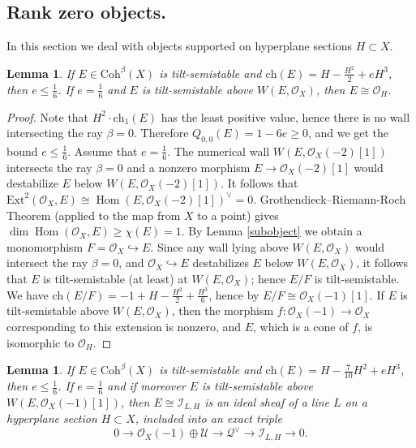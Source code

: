 \documentclass{amsart}
\DeclareMathOperator{\Hom}{Hom}
\newtheorem{lemma}[theorem]{Lemma}
\begin{document}
	\subsection{Rank zero objects.}\label{rank 0} In this section we deal with objects supported on hyperplane sections $H\subset X$.
	
	\begin{lemma}\label{0 1 -1/2} If $E\in\mathrm{Coh}^\beta(X)$ is tilt-semistable and $\mathrm{ch}(E)=H-\frac{H^2}{2}+eH^3$, then $e\le\frac 16$. If $e=\frac 16$ and $E$ is tilt-semistable above $W(E,\mathcal O_X)$, then $E\cong\mathcal O_H$.
	\end{lemma}
	
	\begin{proof}Note that $H^2\cdot\mathrm{ch}_1(E)$ has the least positive value, hence there is no wall intersecting the ray $\beta=0$. Therefore $Q_{0,0}(E)=1-6e\ge 0$, and we get the bound $e\le\frac 16$. Assume that $e=\frac 16$. The numerical wall $W(E,\mathcal O_X(-2)[1])$ intersects the ray $\beta=0$ and a nonzero morphism $E\to\mathcal O_X(-2)[1]$ would destabilize $E$ below $W(E,\mathcal O_X(-2)[1])$. It follows that $\mathrm{Ext}^2(\mathcal O_X,E)\cong\Hom(E,\mathcal O_X(-2)[1])^\vee=0$. Grothendieck--Riemann-Roch Theorem (applied to the map from $X$ to a point) gives $\dim \Hom(\mathcal O_X,E)\ge\chi(E)=1$. By Lemma \ref{subobject} we obtain a monomorphism $F=\mathcal O_X\hookrightarrow E$. Since any wall lying above $W(E,\mathcal O_X)$ would intersect the ray $\beta=0$, and $\mathcal O_X\hookrightarrow E$ destabilizes $E$ below $W(E,\mathcal O_X)$, it follows that $E$ is tilt-semistable (at least) at $W(E,\mathcal O_X)$; hence $E/F$ is tilt-semistable. We have $\mathrm{ch}(E/F)=-1+H-\frac{H^2}{2}+\frac{H^3}{6}$, hence by \cite[Corollary 3.3]{Vass} $E/F\cong\mathcal O_X(-1)[1]$. If $E$ is tilt-semistable above $W(E,\mathcal O_X)$, then the morphism $f:\mathcal O_X(-1)\to\mathcal O_X$ corresponding to this extension is nonzero, and $E$, which is a cone of $f$, is isomorphic to $\mathcal O_H$.
	\end{proof}
	
	\begin{lemma}\label{0 1 -7/10} If $E\in\mathrm{Coh}^\beta(X)$ is tilt-semistable and $\mathrm{ch}(E)=H-\frac{7}{10}H^2+eH^3$, then $e\le\frac 16$. If $e=\frac 16$ and if moreover $E$ is tilt-semistable above $W(E,\mathcal O_X(-1)[1])$, then $E\cong\mathcal I_{L,H}$ is an ideal sheaf of a line $L$ on a hyperplane section $H\subset X$, included into an exact triple
		\begin{equation}\label{triple4.1}0\to\mathcal O_X(-1)\oplus\mathcal U\to\mathcal Q^\vee\to \mathcal I_{L,H}\to 0.\end{equation} 
	\end{lemma}
	
\end{document}
